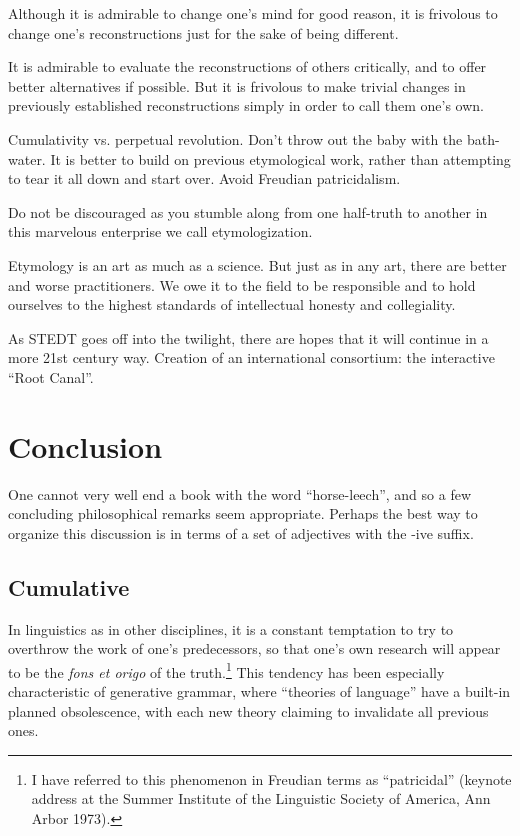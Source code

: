 Although it is admirable to change one’s mind for good reason, it is frivolous to change one’s reconstructions just for the sake of being different.

It is admirable to evaluate the reconstructions of others critically, and to offer better alternatives if possible. But it is frivolous to make trivial changes in previously established reconstructions simply in order to call them one’s own.

Cumulativity vs. perpetual revolution. Don’t throw out the baby with the bath-water. It is better to build on previous etymological work, rather than attempting to tear it all down and start over. Avoid Freudian patricidalism.

Do not be discouraged as you stumble along from one half-truth to another in this marvelous enterprise we call etymologization.

Etymology is an art as much as a science. But just as in any art, there are better and worse practitioners. We owe it to the field to be responsible and to hold ourselves to the highest standards of intellectual 
honesty and collegiality.

As STEDT goes off into the twilight, there are hopes that it will continue in a more 21st century way.  Creation of an international consortium: the interactive “Root Canal”.

\section{Conclusion}
One cannot very well end a book with the word “horse-leech”, and so a few concluding philosophical remarks seem appropriate. Perhaps the best way to organize this discussion is in terms of a set of adjectives with the -ive suffix.

\subsection{Cumulative}

In linguistics as in other disciplines, it is a constant temptation to try to overthrow the work of one’s predecessors, so that one’s own research will appear to be the {\it fons et origo} of the truth.\footnote{I have referred to this phenomenon in Freudian terms as “patricidal” (keynote address at the Summer Institute of the Linguistic Society of America, Ann Arbor 1973).}
This tendency has been especially characteristic of generative grammar, where “theories of language” have a built-in planned obsolescence, with each new theory claiming to invalidate all previous ones.

